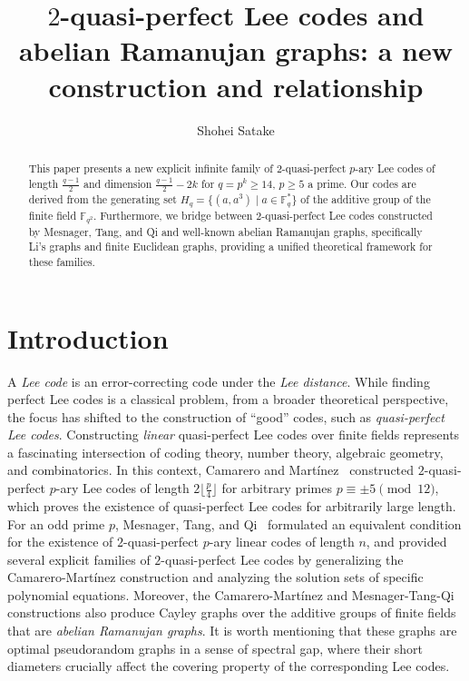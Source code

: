 \documentclass{amsart}
\title[$2$-quasi-perfect Lee codes and abelian Ramanujan graphs]{$2$-quasi-perfect Lee codes and abelian Ramanujan graphs: a new construction and relationship}
\author[Shohei Satake]{Shohei Satake}
\numberwithin{equation}{section}
\begin{document}
\begin{abstract}
This paper presents a new explicit infinite family of 2-quasi-perfect $p$-ary Lee codes of length $\frac{q-1}{2}$ and dimension $\frac{q-1}{2}-2k$ for $q = p^k \ge 14$, $p\geq 5$ a prime.  
Our codes are derived from the generating set $H_q = \{(a, a^3) \mid a \in \mathbb{F}_q^*\}$ of the additive group of the finite field $\mathbb{F}_{q^2}$.  
Furthermore, we bridge between 2-quasi-perfect Lee codes constructed by Mesnager, Tang, and Qi and well-known abelian Ramanujan graphs, specifically Li's graphs and finite Euclidean graphs, providing a unified theoretical framework for these families.
\end{abstract}


\maketitle

\section{Introduction}
A {\it Lee code} is an error-correcting code under the {\it Lee distance}.
While finding perfect Lee codes is a classical problem, from a broader theoretical perspective, the focus has shifted to the construction of ``good'' codes, such as {\it quasi-perfect Lee codes}.
Constructing {\it linear} quasi-perfect Lee codes over finite fields represents a fascinating intersection of coding theory, number theory, algebraic geometry, and combinatorics.
In this context, Camarero and Mart\'{i}nez~\cite{CM2016} constructed $2$-quasi-perfect $p$-ary Lee codes of length $2\lfloor \frac{p}{4} \rfloor$ for arbitrary primes $p\equiv \pm 5 \pmod{12}$, which proves the existence of quasi-perfect Lee codes for arbitrarily large length.
For an odd prime $p$, Mesnager, Tang, and Qi~\cite{MTQ2018} formulated an equivalent condition for the existence of $2$-quasi-perfect $p$-ary linear codes of length $n$, and provided several explicit families of $2$-quasi-perfect Lee codes by generalizing the Camarero-Mart\'{i}nez construction and analyzing the solution sets of specific polynomial equations.
Moreover, the Camarero-Mart\'{i}nez and Mesnager-Tang-Qi constructions also produce Cayley graphs over the additive groups of finite fields that are {\it abelian Ramanujan graphs}.
It is worth mentioning that these graphs are optimal pseudorandom graphs in a sense of spectral gap, where their short diameters crucially affect the covering property of the corresponding Lee codes.
\end{document}
